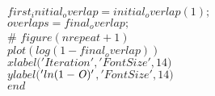  \hspace*{-2.4em}{\scriptsize 113}$  first_initial_overlap = initial_overlap(1);$\\
 \hspace*{-2.4em}{\scriptsize 114}$  overlaps = final_overlap;$\\
 \hspace*{-2.4em}{\scriptsize 115}$  $\\
 \hspace*{-2.4em}{\scriptsize 116}$  $\color{mgreen}#%
 \hspace*{-2.4em}{\scriptsize 117}$  figure(nrepeat+1)$\\
 \hspace*{-2.4em}{\scriptsize 118}$  plot(log(1-final_overlap))$\\
 \hspace*{-2.4em}{\scriptsize 119}$  xlabel($\color{mred}$'Iteration'$\color{black}$,$\color{mred}$'FontSize'$\color{black}$,14)$\\
 \hspace*{-2.4em}{\scriptsize 120}$  ylabel($\color{mred}$'ln(1-{\it O})'$\color{black}$,$\color{mred}$'FontSize'$\color{black}$,14)$\\
 \hspace*{-2.4em}{\scriptsize 121}$  $\color{mblue}$end$\color{black}$$\\ 
  
\UndefineShortVerb{\$} 
\UndefineShortVerb{\#}
